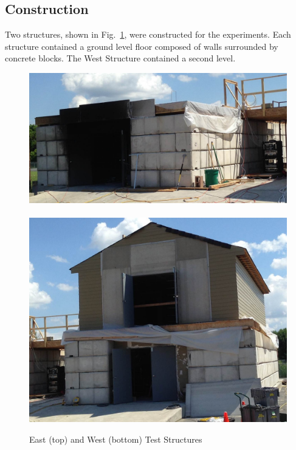 \documentclass[12pt,oneside]{book}
\begin{document}
\subsection{Construction}
\label{sec:Construction}
Two structures, shown in Fig.~\ref{fig:struct_pics}, were constructed for the experiments. Each structure contained a ground level floor composed of walls surrounded by concrete blocks. The West Structure contained a second level.

\begin{figure}[!ht]
\includegraphics[width=6in]{../../Figures/east_structure}
\\~\\
\includegraphics[width=6in]{../../Figures/west_structure}
\caption[East and West Test Structures]{East (top) and West (bottom) Test Structures}
\label{fig:struct_pics}
\end{figure}

\clearpage
\end{document}
